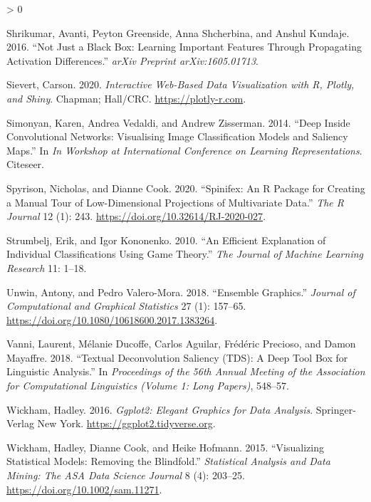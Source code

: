 \documentclass[
]{article}
\newlength{\cslhangindent}
\newenvironment{CSLReferences}[2] %
 {%
  \setlength{\parindent}{0pt}
  \ifodd #1 \everypar{\setlength{\hangindent}{\cslhangindent}}\ignorespaces\fi
  \ifnum #2 > 0
  \setlength{\parskip}{#2\baselineskip}
  \fi
 }%
 {}
\begin{document}
\begin{CSLReferences}{1}{0}
\leavevmode\hypertarget{ref-shrikumar_not_2016}{}%
Shrikumar, Avanti, Peyton Greenside, Anna Shcherbina, and Anshul Kundaje. 2016. {``Not Just a Black Box: {Learning} Important Features Through Propagating Activation Differences.''} \emph{arXiv Preprint arXiv:1605.01713}.

\leavevmode\hypertarget{ref-sievert_interactive_2020}{}%
Sievert, Carson. 2020. \emph{Interactive {Web}-{Based} {Data} {Visualization} with {R}, Plotly, and Shiny}. Chapman; Hall/CRC. \url{https://plotly-r.com}.

\leavevmode\hypertarget{ref-simonyan_deep_2014}{}%
Simonyan, Karen, Andrea Vedaldi, and Andrew Zisserman. 2014. {``Deep Inside Convolutional Networks: {Visualising} Image Classification Models and Saliency Maps.''} In \emph{In {Workshop} at {International} {Conference} on {Learning} {Representations}}. Citeseer.

\leavevmode\hypertarget{ref-spyrison_spinifex_2020}{}%
Spyrison, Nicholas, and Dianne Cook. 2020. {``Spinifex: An {R} {Package} for {Creating} a {Manual} {Tour} of {Low}-Dimensional {Projections} of {Multivariate} {Data}.''} \emph{The R Journal} 12 (1): 243. \url{https://doi.org/10.32614/RJ-2020-027}.

\leavevmode\hypertarget{ref-strumbelj_efficient_2010}{}%
Strumbelj, Erik, and Igor Kononenko. 2010. {``An Efficient Explanation of Individual Classifications Using Game Theory.''} \emph{The Journal of Machine Learning Research} 11: 1--18.

\leavevmode\hypertarget{ref-unwin}{}%
Unwin, Antony, and Pedro Valero-Mora. 2018. {``Ensemble Graphics.''} \emph{Journal of Computational and Graphical Statistics} 27 (1): 157--65. \url{https://doi.org/10.1080/10618600.2017.1383264}.

\leavevmode\hypertarget{ref-vanni_textual_2018}{}%
Vanni, Laurent, Mélanie Ducoffe, Carlos Aguilar, Frédéric Precioso, and Damon Mayaffre. 2018. {``Textual {Deconvolution} {Saliency} ({TDS}): A Deep Tool Box for Linguistic Analysis.''} In \emph{Proceedings of the 56th {Annual} {Meeting} of the {Association} for {Computational} {Linguistics} ({Volume} 1: {Long} {Papers})}, 548--57.

\leavevmode\hypertarget{ref-wickham_ggplot2_2016}{}%
Wickham, Hadley. 2016. \emph{Ggplot2: {Elegant} {Graphics} for {Data} {Analysis}}. Springer-Verlag New York. \url{https://ggplot2.tidyverse.org}.

\leavevmode\hypertarget{ref-wickham_visualizing_2015}{}%
Wickham, Hadley, Dianne Cook, and Heike Hofmann. 2015. {``Visualizing Statistical Models: {Removing} the Blindfold.''} \emph{Statistical Analysis and Data Mining: The ASA Data Science Journal} 8 (4): 203--25. \url{https://doi.org/10.1002/sam.11271}.

\end{CSLReferences}
\end{document}
